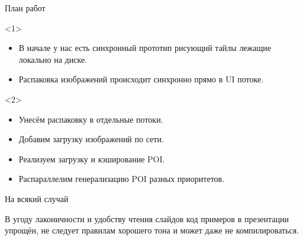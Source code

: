 \documentclass[aspectratio=169,hyperref={unicode},17pt]{beamer}
\begin{document}
\begin{frame}[t]{План работ}
\begin{onlyenv}<1>
\begin{itemize}
 \item В начале у нас есть синхронный прототип рисующий тайлы лежащие локально на диске.
 \item Распаковка изображений происходит синхронно прямо в UI потоке.
\end{itemize}
\end{onlyenv}
\begin{onlyenv}<2>
\begin{itemize}
 \item Унесём распаковку в отдельные потоки.
 \item Добавим загрузку изображений по сети.
 \item Реализуем загрузку и кэширование POI.
 \item Распараллелим генерализацию POI разных приоритетов.
\end{itemize}
\end{onlyenv}
\end{frame}

\begin{frame}[t]{На всякий случай}

В угоду лаконичности и удобству чтения слайдов код примеров в презентации упрощён, не следует правилам хорошего тона и
может даже не компилироваться.
\end{frame}
\end{document}
